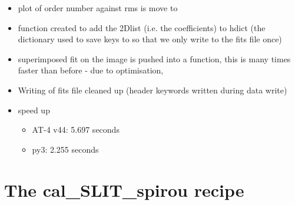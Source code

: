 \begin{itemize}
\item plot of order number against rms is move to 

\item function created to add the 2Dlist (i.e. the coefficients) to hdict (the dictionary used to save keys to so that we only write to the fits file once)

\item superimposed fit on the image is pushed into a function, this is many times faster than before - due to optimisation, 

\item Writing of fits file cleaned up (header keywords written during data write)

\item speed up
	\begin{itemize}
	\item AT-4 v44: 5.697 seconds
	\item py3:  2.255 seconds
    \end{itemize}

\end{itemize}

\section{The cal\_SLIT\_spirou recipe}
\label{ch:changelog:At4:cal_SLIT_spirou}

